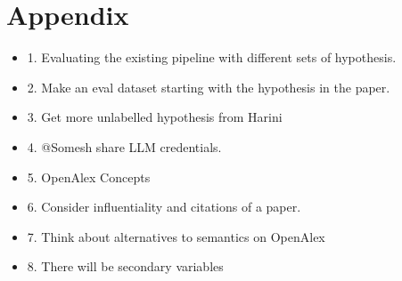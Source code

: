 \section{Appendix}


\begin{itemize}
    \item 1. Evaluating the existing pipeline with different sets of hypothesis.
    \item 2. Make an eval dataset starting with the hypothesis in the paper.
    \item 3. Get more unlabelled hypothesis from Harini
    \item 4. @Somesh share LLM credentials.
    \item 5. OpenAlex Concepts
    \item 6. Consider influentiality and citations of a paper.
    \item 7. Think about alternatives to semantics on OpenAlex
    \item 8. There will be secondary variables
\end{itemize}